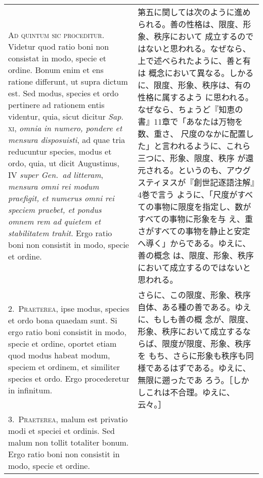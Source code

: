 \documentclass[10pt]{jsarticle} %
\begin{document}
\begin{longtable}{p{21em}p{21em}}


{\huge A}{\scshape d quintum sic proceditur}. Videtur quod ratio boni
 non consistat in modo, specie et ordine. Bonum enim et ens ratione
 differunt, ut supra dictum est. Sed modus, species et ordo pertinere ad
 rationem entis videntur, quia, sicut dicitur {\itshape Sap}.~{\scshape
 xi}, {\itshape omnia in numero, pondere et mensura disposuisti}, ad
 quae tria reducuntur species, modus et ordo, quia, ut dicit Augustinus,
 IV {\itshape super Gen.~ad litteram}, {\itshape mensura omni rei modum
 praefigit, et numerus omni rei speciem praebet, et pondus omnem rem ad
 quietem et stabilitatem trahit}. Ergo ratio boni non consistit in modo,
 specie et ordine.

&


第五に関しては次のように進められる。善の性格は、限度、形象、秩序において
 成立するのではないと思われる。なぜなら、上で述べられたように、善と有は
 概念において異なる。しかるに、限度、形象、秩序は、有の性格に属するよう
 に思われる。なぜなら、ちょうど『知恵の書』11章で「あなたは万物を数、重さ、
 尺度のなかに配置した」と言われるように、これら三つに、形象、限度、秩序
 が還元される。というのも、アウグスティヌスが『創世記逐語注解』4巻で言う
 ように、「尺度がすべての事物に限度を指定し、数がすべての事物に形象を与
 え、重さがすべての事物を静止と安定へ導く」からである。ゆえに、善の概念
 は、限度、形象、秩序において成立するのではないと思われる。

\\


2.~{\scshape Praeterea}, ipse modus, species et ordo bona quaedam sunt. Si ergo
 ratio boni consistit in modo, specie et ordine, oportet etiam quod
 modus habeat modum, speciem et ordinem, et similiter species et
 ordo. Ergo procederetur in infinitum.

&


さらに、この限度、形象、秩序自体、ある種の善である。ゆえに、もしも善の概
 念が、限度、形象、秩序において成立するならば、限度が限度、形象、秩序を
 もち、さらに形象も秩序も同様であるはずである。ゆえに、無限に遡ったであ
 ろう。［しかしこれは不合理。ゆえに、云々。］


\\

3.~{\scshape Praeterea}, malum est privatio modi et speciei et ordinis. Sed
 malum non tollit totaliter bonum. Ergo ratio boni non consistit in
 modo, specie et ordine.

&


\end{longtable}
\end{document}
